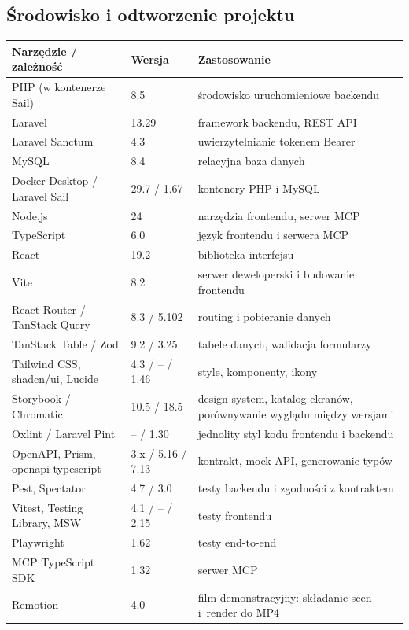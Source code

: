 \documentclass[11pt,a4paper,oneside]{article}
\newif\ifpodpowiedzi
\newcommand{\podpowiedz}[1]{\ifpodpowiedzi\par\begingroup\small\color{hintcolor}\textit{Wskazówka: #1}\par\endgroup\fi}
\begin{document}
\subsection{Środowisko i odtworzenie projektu}
\podpowiedz{Opisz środowisko potrzebne do dalszej edycji, budowania lub odtworzenia rezultatu: system operacyjny, sprzęt, programy, biblioteki i ich wersje. Dla animacji wskaż np. wersję programu, dodatki, silnik renderujący i ustawienia eksportu. Szczegółową instrukcję instalacji i konfiguracji można wskazać w osobnej dokumentacji instalacyjno-konfiguracyjnej, jeśli jest wymagana. Nie powielaj tych samych informacji; podaj odwołanie do odpowiedniej sekcji.}
\begin{tabularx}{\textwidth}{@{}Y l Y@{}}
\toprule
Narzędzie / zależność & Wersja & Zastosowanie\\
\midrule
PHP (w kontenerze Sail) & 8.5 & środowisko uruchomieniowe backendu\\
Laravel & 13.29 & framework backendu, REST API\\
Laravel Sanctum & 4.3 & uwierzytelnianie tokenem Bearer\\
MySQL & 8.4 & relacyjna baza danych\\
Docker Desktop / Laravel Sail & 29.7 / 1.67 & kontenery PHP i MySQL\\
Node.js & 24 & narzędzia frontendu, serwer MCP\\
TypeScript & 6.0 & język frontendu i serwera MCP\\
React & 19.2 & biblioteka interfejsu\\
Vite & 8.2 & serwer deweloperski i budowanie frontendu\\
React Router / TanStack Query & 8.3 / 5.102 & routing i pobieranie danych\\
TanStack Table / Zod & 9.2 / 3.25 & tabele danych, walidacja formularzy\\
Tailwind CSS, shadcn/ui, Lucide & 4.3 / -- / 1.46 & style, komponenty, ikony\\
Storybook / Chromatic & 10.5 / 18.5 & design system, katalog ekranów, porównywanie wyglądu między wersjami\\
Oxlint / Laravel Pint & -- / 1.30 & jednolity styl kodu frontendu i backendu\\
OpenAPI, Prism, openapi-typescript & 3.x / 5.16 / 7.13 & kontrakt, mock API, generowanie typów\\
Pest, Spectator & 4.7 / 3.0 & testy backendu i zgodności z kontraktem\\
Vitest, Testing Library, MSW & 4.1 / -- / 2.15 & testy frontendu\\
Playwright & 1.62 & testy end-to-end\\
MCP TypeScript SDK & 1.32 & serwer MCP\\
Remotion & 4.0 & film demonstracyjny: składanie scen i~render do MP4\\
\bottomrule
\end{tabularx}
\end{document}
